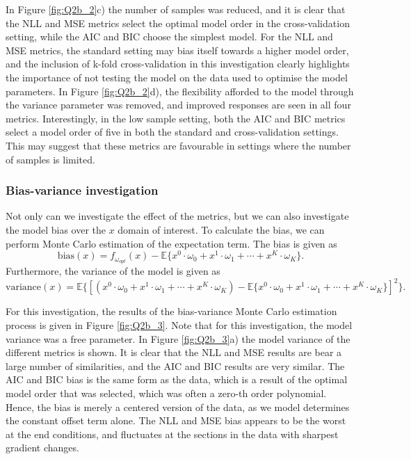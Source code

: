 \documentclass{article}
\begin{document}
In Figure \ref{fig:Q2b_2}c) the number of samples was reduced, and it is clear that the NLL and MSE metrics select the optimal model order in the cross-validation setting, while the AIC and BIC choose the simplest model. For the NLL and MSE metrics, the standard setting may bias itself towards a higher model order, and the inclusion of k-fold cross-validation in this investigation clearly highlights the importance of not testing the model on the data used to optimise the model parameters. In Figure \ref{fig:Q2b_2}d),  the flexibility afforded to the model through the variance parameter was removed, and improved responses are seen in all four metrics. Interestingly, in the low sample setting, both the AIC and BIC metrics select a model order of five in both the standard and cross-validation settings. This may suggest that these metrics are favourable in settings where the number of samples is limited. 

\subsubsection{Bias-variance investigation}

Not only can we investigate the effect of the metrics, but we can also investigate the model bias over the $x$ domain of interest. To calculate the bias, we can perform Monte Carlo estimation of the expectation term. The bias is given as 
\begin{equation}
    \text{bias}(x) = f_{\omega_{opt}}(x) - \mathbb{E}\{ x^{0}\cdot\omega_0 + x^{1}\cdot\omega_1 + \cdots + x^{K}\cdot\omega_K\}.
\end{equation}
Furthermore, the variance of the model is given as 
\begin{equation}
\text{variance}(x) = \mathbb{E} \{ \left[\left( x^{0}\cdot\omega_0 + x^{1}\cdot\omega_1 + \cdots + x^{K}\cdot\omega_K\right) - \mathbb{E}\{ x^{0}\cdot\omega_0 + x^{1}\cdot\omega_1 + \cdots + x^{K}\cdot\omega_K\}\right]^2 \}.
\end{equation}

For this investigation, the results of the bias-variance Monte Carlo estimation process is given in Figure \ref{fig:Q2b_3}. Note that for this investigation, the model variance was a free parameter. In Figure \ref{fig:Q2b_3}a) the model variance of the different metrics is shown. It is clear that the NLL and MSE results are bear a large number of similarities, and the AIC and BIC results are very similar. The AIC and BIC bias is the same form as the data, which is a result of the optimal model order that was selected, which was often a zero-th order polynomial. Hence, the bias is merely a centered version of the data, as we model determines the constant offset term alone. The NLL and MSE bias appears to be the worst at the end conditions, and fluctuates at the sections in the data with sharpest gradient changes. 
\end{document}
